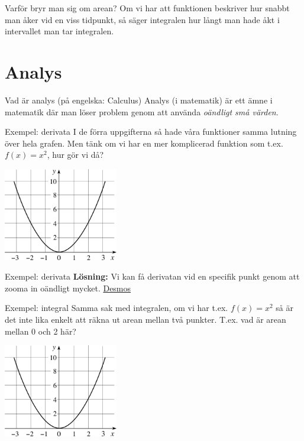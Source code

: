 \documentclass{beamer}
\begin{document}
\begin{frame}{Varför bryr man sig om arean?}
Om vi har att funktionen beskriver hur snabbt man åker vid en viss tidpunkt,
så säger integralen hur långt man hade åkt i intervallet man tar integralen.
\end{frame}


\section*{Analys}
\label{sec:org8fc3346}
\begin{frame}{Vad är analys (på engelska: Calculus)}
Analys (i matematik) är ett ämne i matematik där man löser problem
genom att använda \emph{oändligt små värden}.
\end{frame}

\begin{frame}{Exempel: derivata}
I de förra uppgifterna så hade våra funktioner samma lutning över
hela grafen. Men tänk om vi har en mer komplicerad funktion
som t.ex. \(f(x) = x^2\), hur gör vi då?
\begin{center}
\includegraphics[angle=0,width=5cm]{./img/squared.png}
\end{center}
\end{frame}

\begin{frame}{Exempel: derivata}
\textbf{Lösning:} Vi kan få derivatan vid en specifik punkt genom att
zooma in oändligt mycket. \href{https://desmos.com/calculator}{Desmos}
\end{frame}

\begin{frame}{Exempel: integral}
Samma sak med integralen, om vi har t.ex. \(f(x) = x^2\) så är
det inte lika enkelt att räkna ut arean mellan två punkter.
T.ex. vad är arean mellan 0 och 2 här?
\begin{center}
\includegraphics[angle=0,width=5cm]{./img/squared.png}
\end{center}
\end{frame}
\end{document}
